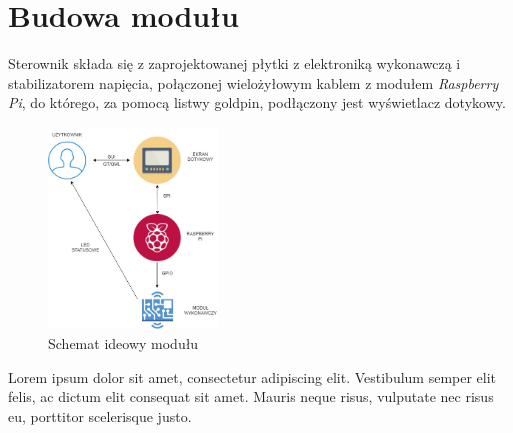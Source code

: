 \documentclass[12pt, eng, twoside, openany, final]{mgr}
\begin{document}
    \section{Budowa modułu}
    Sterownik składa się z zaprojektowanej płytki z elektroniką wykonawczą i stabilizatorem napięcia, połączonej wielożyłowym kablem z modułem \emph{Raspberry Pi}, do którego, za pomocą listwy goldpin, podłączony jest wyświetlacz dotykowy.
        \begin{figure}[H]
        \begin{center}
            \includegraphics[width=0.4\textwidth]{diagram.jpg}
            \caption{Schemat ideowy modułu}
        \end{center}
        \end{figure}
        Lorem ipsum dolor sit amet, consectetur adipiscing elit. Vestibulum semper elit felis, ac dictum elit consequat sit amet. Mauris neque risus, vulputate nec risus eu, porttitor scelerisque justo.  
        
\end{document}

